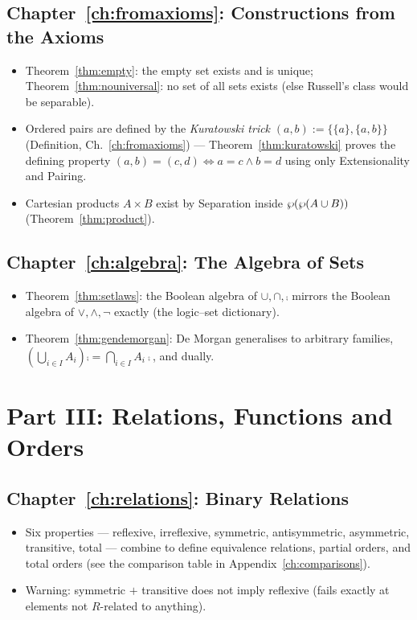 \subsection*{Chapter~\ref{ch:fromaxioms}: Constructions from the Axioms}
\begin{itemize}
	\item Theorem~\ref{thm:empty}: the empty set exists and is unique; Theorem~\ref{thm:nouniversal}: no set of all sets exists (else Russell's class would be separable).
	\item Ordered pairs are defined by the \emph{Kuratowski trick} $(a,b):=\{\{a\},\{a,b\}\}$ (Definition, Ch.~\ref{ch:fromaxioms}) --- Theorem~\ref{thm:kuratowski} proves the defining property $(a,b)=(c,d)\iff a=c\wedge b=d$ using only Extensionality and Pairing.
	\item Cartesian products $A\times B$ exist by Separation inside $\wp(\wp(A\cup B))$ (Theorem~\ref{thm:product}).
\end{itemize}

\subsection*{Chapter~\ref{ch:algebra}: The Algebra of Sets}
\begin{itemize}
	\item Theorem~\ref{thm:setlaws}: the Boolean algebra of $\cup,\cap,\comp$ mirrors the Boolean algebra of $\vee,\wedge,\neg$ exactly (the logic--set dictionary).
	\item Theorem~\ref{thm:gendemorgan}: De Morgan generalises to arbitrary families, $\left(\bigcup_{i\in I}A_i\right)\comp=\bigcap_{i\in I}A_i\comp$, and dually.
\end{itemize}

\section*{Part III: Relations, Functions and Orders}

\subsection*{Chapter~\ref{ch:relations}: Binary Relations}
\begin{itemize}
	\item Six properties --- reflexive, irreflexive, symmetric, antisymmetric, asymmetric, transitive, total --- combine to define equivalence relations, partial orders, and total orders (see the comparison table in Appendix~\ref{ch:comparisons}).
	\item Warning: symmetric $+$ transitive does not imply reflexive (fails exactly at elements not $R$-related to anything).
\end{itemize}

